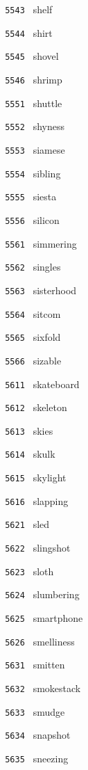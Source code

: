 \documentclass[11pt]{article}
\begin{document}
\begin{multicols}{6}
\noindent \texttt{ 5543 } shelf  \par
\noindent \texttt{ 5544 } shirt  \par
\noindent \texttt{ 5545 } shovel  \par
\noindent \texttt{ 5546 } shrimp  \par
\noindent \texttt{ 5551 } shuttle  \par
\noindent \texttt{ 5552 } shyness  \par
\noindent \texttt{ 5553 } siamese  \par
\noindent \texttt{ 5554 } sibling  \par
\noindent \texttt{ 5555 } siesta  \par
\noindent \texttt{ 5556 } silicon  \par
\noindent \texttt{ 5561 } simmering  \par
\noindent \texttt{ 5562 } singles  \par
\noindent \texttt{ 5563 } sisterhood  \par
\noindent \texttt{ 5564 } sitcom  \par
\noindent \texttt{ 5565 } sixfold  \par
\noindent \texttt{ 5566 } sizable  \par
\noindent \texttt{ 5611 } skateboard  \par
\noindent \texttt{ 5612 } skeleton  \par
\noindent \texttt{ 5613 } skies  \par
\noindent \texttt{ 5614 } skulk  \par
\noindent \texttt{ 5615 } skylight  \par
\noindent \texttt{ 5616 } slapping  \par
\noindent \texttt{ 5621 } sled  \par
\noindent \texttt{ 5622 } slingshot  \par
\noindent \texttt{ 5623 } sloth  \par
\noindent \texttt{ 5624 } slumbering  \par
\noindent \texttt{ 5625 } smartphone  \par
\noindent \texttt{ 5626 } smelliness  \par
\noindent \texttt{ 5631 } smitten  \par
\noindent \texttt{ 5632 } smokestack  \par
\noindent \texttt{ 5633 } smudge  \par
\noindent \texttt{ 5634 } snapshot  \par
\noindent \texttt{ 5635 } sneezing  \par

\end{multicols}
\end{document}
